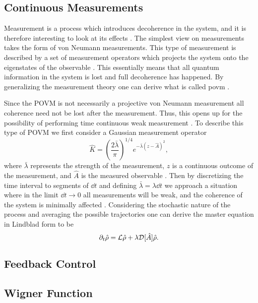 \subsection{Continuous Measurements}
Measurement is a process which introduces decoherence in the system, and it is therefore interesting to look at its effects \cite{Jordan:2024}. The simplest view on measurements takes the form of von Neumann measurements. This type of measurement is described by a set of measurement operators which projects the system onto the eigenstates of the observable \cite{Annby-Andersson:2024}. This essentially means that all quantum information in the system is lost and full decoherence has happened. By generalizing the measurement theory one can derive what is called \gls{povm} \cite{Annby-Andersson:2024}.

Since the POVM is not necessarily a projective von Neumann measurement all coherence need not be lost after the measurement. Thus, this opens up for the possibility of performing time continuous weak measurement \cite{Annby-Andersson:2024}. To describe this type of POVM we first consider a Gaussian measurement operator
\begin{equation}
    \hat{K} = \left(\frac{2 \bar{\lambda}}{\pi}\right)^{1/4} e^{-\bar{\lambda}(z - \hat{A})^2},
\end{equation}
where $\bar{\lambda}$ represents the strength of the measurement, $z$ is a continuous outcome of the measurement, and $\hat{A}$ is the measured observable \cite{Annby-Andersson:2024}. Then by discretizing the time interval to segments of $\dd t$ and defining $\bar{\lambda} = \lambda \dd t$ we approach a situation where in the limit $\dd t \to 0$ all measurements will be weak, and the coherence of the system is minimally affected \cite{Annby-Andersson:2024}. Considering the stochastic nature of the process and averaging the possible trajectories one can derive the master equation \cite{Annby-Andersson:2024} in Lindblad form to be 
\begin{equation}
    \partial_t\hat{\rho} = \mathcal{L}\hat{\rho} + \lambda \mathcal{D}[\hat{A}] \hat{\rho}. \label{eq:masterMeas}
\end{equation}

\subsection{Feedback Control}
\subsection{Wigner Function}